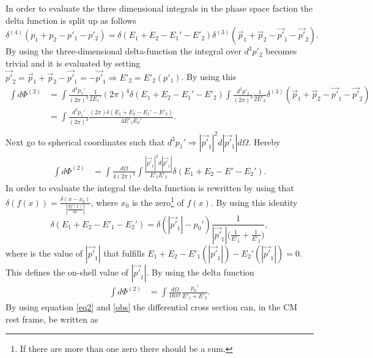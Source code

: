 In order to evaluate the three dimensional integrals in the phase space faction the delta function is split up as follows
\begin{equation}
	\delta^{(4)}(p_1+p_2-p'_1-p'_2)=\delta(E_1+E_2-E_1'-E'_2)\delta^{(3)}(\vec{p}_1+\vec{p}_2-\vec{p'}_1-\vec{p'}_2).
\end{equation} 
By using the three-dimensional delta-function the integral over $d^3p'_2$ becomes trivial and it is evaluated by setting $\vec{p'}_2=\vec{p}_1+\vec{p}_2-\vec{p'}_1=-\vec{p'}_1\Rightarrow E'_2=E'_2(p'_1)$. By using this
\begin{equation}
	\begin{split}
		\int d\Phi^{(2)}&=\int\frac{d^3p_1'}{(2\pi)^3}\frac{1}{2E_1 '}(2\pi)^4\delta(E_1+E_2-E_1'-E'_2)\int\frac{d^3p'_2}{(2\pi)^3}\frac{1}{2E'_2}\delta^{(3)}(\vec{p}_1+\vec{p}_2-\vec{p'}_1-\vec{p'}_2)\\
		&=\int\frac{d^3p_1'}{(2\pi)^3}\frac{(2\pi)\delta(E_1+E_2-E_1'-E'_2)}{4E'_1E_2'}.\\
	\end{split}
\end{equation} 
Next go to spherical coordinates such that $d^3p_1'\Rightarrow |\vec{p'}_1|^2d|\vec{p'}_1|d\Omega$. Hereby
\begin{equation}
	\begin{split}
		\int d\Phi^{(2)}&=\int\frac{d\Omega}{4(2\pi)^2}   \int\frac{|\vec{p'}_1|^2d|\vec{p'}_1|}{E'_1E'_2}\delta(E_1+E_2-E'-E_2').
	\end{split}
\end{equation} 
In order to evaluate the integral the delta function is rewritten by using that $\delta(f(x))=\frac{\delta(x-x_0)}{|\frac{df(x)}{dx}|}$, where $x_0$ is the zero\footnote{If there are more than one zero there should be a sum.} of $f(x)$. By using this identity
\begin{equation}
	\delta(E_1+E_2-E'_1-E_2')=\delta(|\vec{p'}_1|-p_0')\frac{1}{|\vec{p'}_1|\big(\frac{1}{E'_1}+\frac{1}{E'_2}\big)},
\end{equation} 
where is the value of $|\vec{p'}_1|$ that fulfills $E_1+E_2-E'_1(|\vec{p'}_1|)-E_2'(|\vec{p'}_1|)=0$. This defines the on-shell value of $|\vec{p'}_1|$. By using the delta function
\begin{equation}
	\begin{split}
		\int d\Phi^{(2)}&=\int\frac{d\Omega}{16\pi^2}   \frac{p_0'}{E'_1+E'_2}.
		\end{split}
	\label{eq2}
\end{equation} 
By using equation \eqref{eq2} and \eqref{obs} the differential cross section can, in the CM rest frame, be written as
